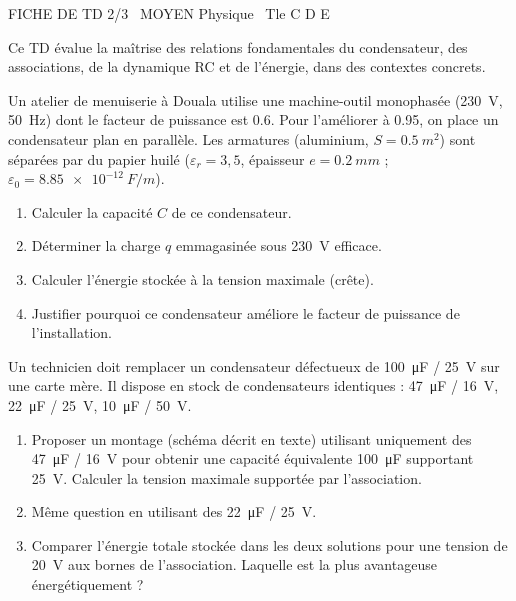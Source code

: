 \documentclass[11pt]{article}
\begin{document}
\begin{tcolorbox}[enhanced,colback=popink,colframe=popink,arc=10pt,boxrule=0pt,left=12pt,right=12pt,top=9pt,bottom=9pt]
{\color{white}\popxbold\small FICHE DE TD 2/3 \textbullet\ MOYEN \hfill Physique \textbullet\ Tle C D E\par}
\end{tcolorbox}
\vspace{4pt}
Ce TD évalue la maîtrise des relations fondamentales du condensateur, des associations, de la dynamique RC et de l'énergie, dans des contextes concrets.

\begin{exercice}
Un atelier de menuiserie à Douala utilise une machine-outil monophasée (\SI{230}{V}, \SI{50}{Hz}) dont le facteur de puissance est \num{0,6}. Pour l'améliorer à \num{0,95}, on place un condensateur plan en parallèle. Les armatures (aluminium, $S = \SI{0,5}{m^2}$) sont séparées par du papier huilé ($\varepsilon_r = 3,5$, épaisseur $e = \SI{0,2}{mm}$ ; $\varepsilon_0 = \SI{8,85e-12}{F/m}$).
\begin{enumerate}
    \item Calculer la capacité $C$ de ce condensateur.
    \item Déterminer la charge $q$ emmagasinée sous \SI{230}{V} efficace.
    \item Calculer l'énergie stockée à la tension maximale (crête).
    \item Justifier pourquoi ce condensateur améliore le facteur de puissance de l'installation.
\end{enumerate}
\end{exercice}

\begin{exercice}
Un technicien doit remplacer un condensateur défectueux de \SI{100}{\micro F} / \SI{25}{V} sur une carte mère. Il dispose en stock de condensateurs identiques : \SI{47}{\micro F} / \SI{16}{V}, \SI{22}{\micro F} / \SI{25}{V}, \SI{10}{\micro F} / \SI{50}{V}.
\begin{enumerate}
    \item Proposer un montage (schéma décrit en texte) utilisant uniquement des \SI{47}{\micro F} / \SI{16}{V} pour obtenir une capacité équivalente \SI{100}{\micro F} supportant \SI{25}{V}. Calculer la tension maximale supportée par l'association.
    \item Même question en utilisant des \SI{22}{\micro F} / \SI{25}{V}.
    \item Comparer l'énergie totale stockée dans les deux solutions pour une tension de \SI{20}{V} aux bornes de l'association. Laquelle est la plus avantageuse énergétiquement ?
\end{enumerate}
\end{exercice}
\end{document}
